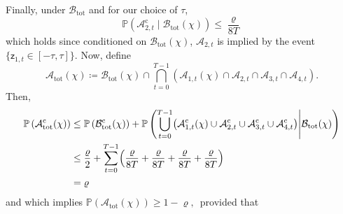 \documentclass[11pt]{article}
\theoremstyle{definition}
\theoremstyle{plain}
\begin{document}
Finally, under $\mathcal{B}_{\mathrm{tot}}$ and for our choice of $\tau$,
\begin{equation}
    \mathbb{P}\left(\mathcal{A}_{2,t}^{\mathrm{c}} \mid \mathcal{B}_{\mathrm{tot}}(\chi)\right) \le \frac{\varrho}{8T}
\end{equation}
which holds since conditioned on $\mathcal{B}_{\mathrm{tot}}(\chi)$, $\mathcal{A}_{2,t}$ is implied by the event $\{\mathsf z_{1,t}\in[-\tau,\tau]\}$. Now, define
\begin{equation}
    \mathcal{A}_{\mathrm{tot}}(\chi) \coloneq \mathcal{B}_{\mathrm{tot}}(\chi) \cap \bigcap_{t=0}^{T-1} \left( \mathcal{A}_{1,t}(\chi)\cap \mathcal{A}_{2,t}\cap \mathcal{A}_{3,t}\cap \mathcal{A}_{4,t} \right).
\end{equation}
Then,
\begin{align}
    \mathbb{P}\left(\mathcal{A}_{\mathrm{tot}}^{\mathrm{c}}(\chi)\right)
    &\leq \mathbb{P}\left(\mathcal{B}_{\mathrm{tot}}^{\mathrm{c}}(\chi)\right)
    + \mathbb{P}\left(\bigcup_{t=0}^{T-1}\bigl(\mathcal{A}_{1,t}^{\mathrm{c}}(\chi)\cup\mathcal{A}_{2,t}^{\mathrm{c}}\cup\mathcal{A}_{3,t}^{\mathrm{c}}\cup\mathcal{A}_{4,t}^{\mathrm{c}}\bigr) \middle| \mathcal{B}_{\mathrm{tot}}(\chi)\right)\notag \\
    &\leq \frac{\varrho}{2} + \sum_{t=0}^{T-1}\hspace{-0.15em}\left(\frac{\varrho}{8T} + \frac{\varrho}{8T} + \frac{\varrho}{8T} + \frac{\varrho}{8T}\right)\notag\\
    &=\varrho
\end{align}
and which implies $\mathbb P(\mathcal{A}_{\mathrm{tot}}(\chi))\ge 1-\varrho,$\    provided that 
\end{document}
